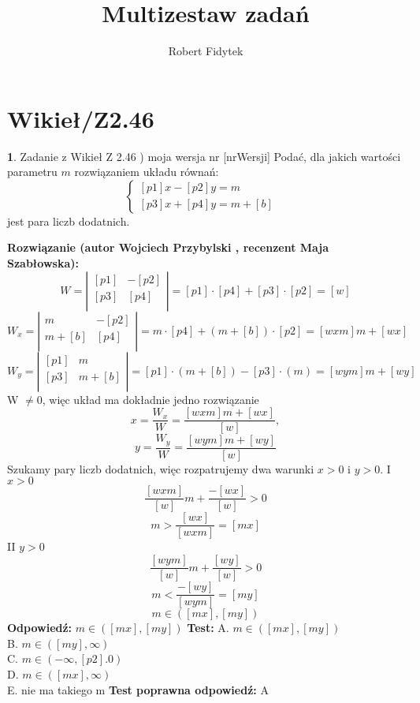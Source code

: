 \documentclass[12pt, a4paper]{article}
\title{Multizestaw zadań}
\author{Robert Fidytek}
\date{}
\theoremstyle{definition} %
\newtheorem{zad}{}
\newcommand{\kategoria}[1]{\section{#1}} %
\newcommand{\zadStart}[1]{\begin{zad}#1\newline} %
\newcommand{\zadStop}{\end{zad}}   %
\newcommand{\rozwStart}[2]{\noindent \textbf{Rozwiązanie (autor #1 , recenzent #2): }\newline} %
\newcommand{\rozwStop}{\newline}                                            %
\newcommand{\odpStart}{\noindent \textbf{Odpowiedź:}\newline}    %
\newcommand{\odpStop}{\newline}                                             %
\newcommand{\testStart}{\noindent \textbf{Test:}\newline} %
\newcommand{\testStop}{\newline} %
\newcommand{\kluczStart}{\noindent \textbf{Test poprawna odpowiedź:}\newline} %
\newcommand{\kluczStop}{\newline} %
\begin{document}
\maketitle


\kategoria{Wikieł/Z2.46}
\zadStart{Zadanie z Wikieł Z 2.46 ) moja wersja nr [nrWersji]}
Podać, dla jakich wartości parametru $m$ rozwiązaniem układu równań:
$$
 \left\{ \begin{array}{ll}
[p1] x-[p2] y=m & \\
{[p3]} x+[p4] y=m+[b]  & 
\end{array} \right.
$$
jest para liczb dodatnich.
\zadStop
\rozwStart{Wojciech Przybylski}{Maja Szabłowska}
$$
W =
\left| \begin{array}{ccc}
[p1] & -[p2]  \\
{[p3]} & [p4]  \\
\end{array} \right| =[p1]\cdot[p4]+[p3]\cdot[p2]=[w]
$$
$$
W_{x} =
\left| \begin{array}{ccc}
m & -[p2]  \\
m+[b] & [p4]  \\
\end{array} \right| =m\cdot[p4]+(m+[b])\cdot[p2]=[wxm]m+[wx]
$$
$$
W_{y} =
\left| \begin{array}{ccc}
[p1] & m \\
{[p3]} & m+[b]  \\
\end{array} \right| =[p1]\cdot(m+[b])-[p3]\cdot(m)=[wym]m+[wy]
$$
W $\neq 0$, więc układ ma dokładnie jedno rozwiązanie
$$x=\frac{W_{x}}{W}=\frac{[wxm]m+[wx]}{[w]},$$
$$y=\frac{W_{y}}{W}=\frac{[wym]m+[wy]}{[w]}$$
Szukamy pary liczb dodatnich, więc rozpatrujemy dwa warunki $x>0$ i $y>0$.
I $x>0$
$$\frac{[wxm]}{[w]}m+\frac{-[wx]}{[w]}>0$$
$$m>\frac{[wx]}{[wxm]}=[mx]$$
II $y>0$
$$\frac{[wym]}{[w]}m+\frac{[wy]}{[w]}>0$$
$$m<\frac{-[wy]}{[wym]}=[my]$$
$$m\in([mx],[my])$$
\rozwStop
\odpStart
$m\in([mx],[my])$
\odpStop
\testStart
A. $m\in([mx],[my])$\\
B. $m\in([my],\infty)$\\
C. $m\in(-\infty,[p2].0)$\\
D. $m\in([mx],\infty)$\\
E. nie ma takiego m 
\testStop
\kluczStart
A
\kluczStop
\end{document}
